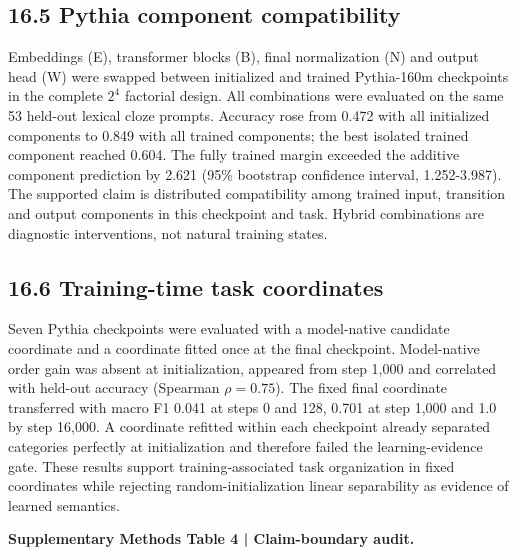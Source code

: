 \documentclass[10pt]{article}
\begin{document}
\subsection*{16.5 Pythia component compatibility}

Embeddings (E), transformer blocks (B), final normalization (N) and output head (W) were swapped between initialized and trained Pythia-160m checkpoints in the complete \(2^4\) factorial design. All combinations were evaluated on the same 53 held-out lexical cloze prompts. Accuracy rose from 0.472 with all initialized components to 0.849 with all trained components; the best isolated trained component reached 0.604. The fully trained margin exceeded the additive component prediction by 2.621 (95\% bootstrap confidence interval, 1.252-3.987). The supported claim is distributed compatibility among trained input, transition and output components in this checkpoint and task. Hybrid combinations are diagnostic interventions, not natural training states.

\subsection*{16.6 Training-time task coordinates}

Seven Pythia checkpoints were evaluated with a model-native candidate coordinate and a coordinate fitted once at the final checkpoint. Model-native order gain was absent at initialization, appeared from step 1,000 and correlated with held-out accuracy (Spearman \(\rho=0.75\)). The fixed final coordinate transferred with macro F1 0.041 at steps 0 and 128, 0.701 at step 1,000 and 1.0 by step 16,000. A coordinate refitted within each checkpoint already separated categories perfectly at initialization and therefore failed the learning-evidence gate. These results support training-associated task organization in fixed coordinates while rejecting random-initialization linear separability as evidence of learned semantics.

\textbf{Supplementary Methods Table 4 | Claim-boundary audit.}
\end{document}
